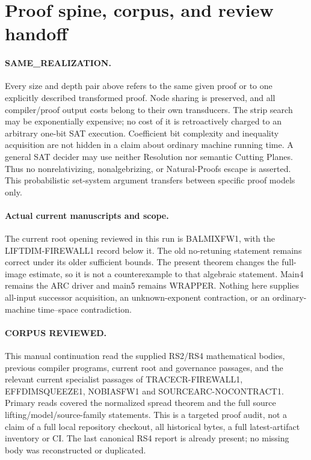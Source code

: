 \documentclass[11pt]{article}
\begin{document}
\section{Proof spine, corpus, and review handoff}
\paragraph{SAME\_REALIZATION.}
Every size and depth pair above refers to the same given proof or to one
explicitly described transformed proof. Node sharing is preserved, and all
compiler/proof output costs belong to their own transducers. The strip
search may be exponentially expensive; no cost of it is retroactively
charged to an arbitrary one-bit SAT execution. Coefficient bit complexity
and inequality acquisition are not hidden in a claim about ordinary machine
running time. A general SAT decider may use neither Resolution nor semantic
Cutting Planes. Thus no nonrelativizing, nonalgebrizing, or Natural-Proofs
escape is asserted. This probabilistic set-system argument transfers between
specific proof models only.

\paragraph{Actual current manuscripts and scope.}
The current root opening reviewed in this run is BALMIXFW1, with the
LIFTDIM-FIREWALL1 record below it. The old no-retuning statement remains
correct under its older sufficient bounds. The present theorem changes the
full-image estimate, so it is not a counterexample to that algebraic
statement. Main4 remains the ARC driver and main5 remains WRAPPER. Nothing
here supplies all-input successor acquisition, an unknown-exponent
contraction, or an ordinary-machine time--space contradiction.

\paragraph{CORPUS REVIEWED.}
This manual continuation read the supplied RS2/RS4 mathematical bodies,
previous compiler programs, current root and governance passages, and the
relevant current specialist passages of TRACECR-FIREWALL1, EFFDIMSQUEEZE1,
NOBIASFW1 and SOURCEARC-NOCONTRACT1. Primary reads covered the normalized
spread theorem and the full source lifting/model/source-family statements.
This is a targeted proof audit, not a claim of a full local repository
checkout, all historical bytes, a full latest-artifact inventory or CI.
The last canonical RS4 report is already present; no missing body was
reconstructed or duplicated.
\end{document}
